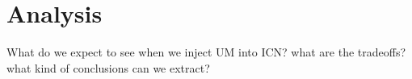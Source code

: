 \section{Analysis}
What do we expect to see when we inject UM into ICN? what are the tradeoffs? what kind of conclusions can we extract?